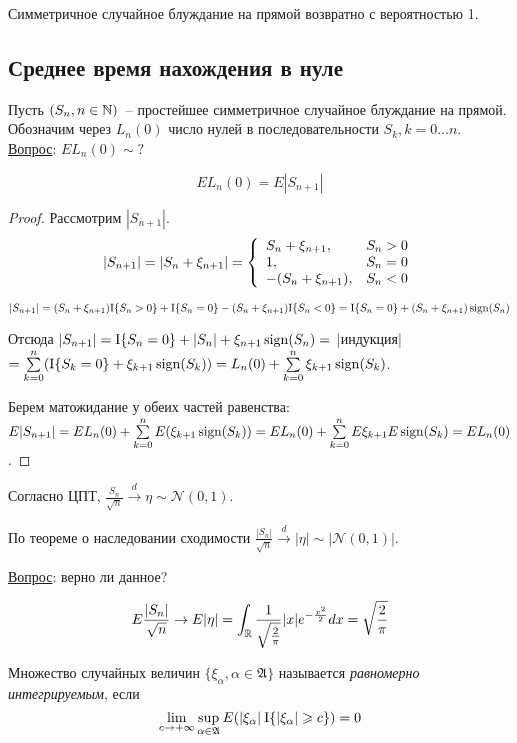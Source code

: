 \begin{corollary}
Симметричное случайное блуждание на прямой возвратно с вероятностью 1.
\end{corollary}

\subsection{Среднее время нахождения в нуле}
Пусть $(S_n, n \in \mathbb{N})$~-- простейшее симметричное случайное блуждание на прямой.
Обозначим через $L_n(0)$ число нулей в последовательности $S_k, k = 0 \dots n$.
\underline{Вопрос}: $EL_n(0) \sim ?$

\begin{lem}
$$EL_n(0) = E|S_{n+1}|$$
\end{lem}
\begin{proof}
Рассмотрим $|S_{n+1}|$.
$$
|S_{n+1}| = |S_n + \xi_{n+1}| = \left\lbrace
\begin{array}{l r}
	S_n + \xi_{n+1}, & S_n > 0 \\
	1, & S_n = 0 \\
	-(S_n + \xi_{n+1}), & S_n < 0
\end{array}
\right.
$$

$|S_{n+1}| = (S_n + \xi_{n+1})\mathrm{I}\{ S_n > 0 \} + \mathrm{I}\{ S_n = 0 \}
- (S_n + \xi_{n+1}) \mathrm{I}\{ S_n < 0 \} =
\mathrm{I}\{ S_n = 0 \} + (S_n + \xi_{n+1}) \operatorname{sign}(S_n)$

Отсюда $|S_{n+1}| = \mathrm{I}\{ S_n = 0 \} + |S_n| + \xi_{n+1} \operatorname{sign}(S_n) = $ |индукция|
$ = \sum\limits_{k=0}^n (\mathrm{I}\{ S_k = 0 \} + \xi_{k+1} \operatorname{sign}(S_k)) = L_n(0) +
\sum\limits_{k=0}^n \xi_{k+1}\operatorname{sign}(S_k)$.

Берем матожидание у обеих частей равенства:
$E|S_{n+1}| = EL_n(0) + \sum\limits_{k=0}^nE(\xi_{k+1}\operatorname{sign}(S_k)) =
EL_n(0) + \sum\limits_{k=0}^n E\xi_{k+1} E\operatorname{sign}(S_k) = EL_n(0)$.
\end{proof}

Согласно ЦПТ,
$\frac{S_n}{\sqrt{n}} \overset{d}{\to} \eta \sim \mathcal{N}(0, 1)$.

По теореме о наследовании сходимости
$\frac{|S_n|}{\sqrt{n}} \overset{d}{\to} |\eta| \sim |\mathcal{N}(0, 1)|$.

\underline{Вопрос}: верно ли данное?

$$E \frac{|S_n|}{\sqrt{n}} \to E|\eta| =
\int_{\mathbb{R}} \frac{1}{\sqrt{\frac{2}{\pi}}} |x| e^{-\frac{x^2}{2}} dx = \sqrt{\frac{2}{\pi}}$$

\begin{definition}
Множество случайных величин $\{\xi_\alpha, \alpha \in \mathfrak{A}\}$ называется
\emph{равномерно интегрируемым}, если
$$\lim\limits_{c \to +\infty}\sup_{\alpha \in \mathfrak{A}}
E(|\xi_\alpha| \: \mathrm{I}\{ |\xi_\alpha| \geqslant c \}) = 0$$
\end{definition}

